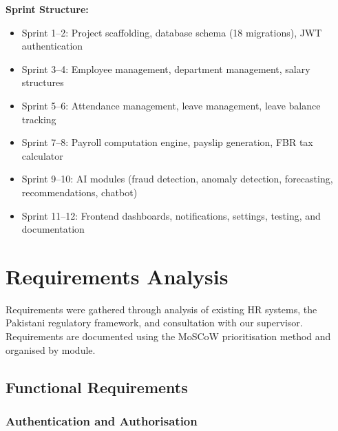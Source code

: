 \documentclass[12pt,a4paper]{report}
\begin{document}
\textbf{Sprint Structure:}
\begin{itemize}
    \item Sprint 1--2: Project scaffolding, database schema (18 migrations), JWT authentication
    \item Sprint 3--4: Employee management, department management, salary structures
    \item Sprint 5--6: Attendance management, leave management, leave balance tracking
    \item Sprint 7--8: Payroll computation engine, payslip generation, FBR tax calculator
    \item Sprint 9--10: AI modules (fraud detection, anomaly detection, forecasting, recommendations, chatbot)
    \item Sprint 11--12: Frontend dashboards, notifications, settings, testing, and documentation
\end{itemize}

\section{Requirements Analysis}

Requirements were gathered through analysis of existing HR systems, the Pakistani regulatory framework, and consultation with our supervisor. Requirements are documented using the MoSCoW prioritisation method and organised by module.

\subsection{Functional Requirements}

\subsubsection{Authentication and Authorisation}
\end{document}
